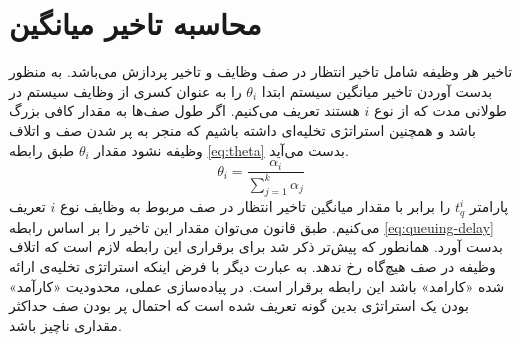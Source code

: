 \section{محاسبه تاخیر میانگین}
تاخیر هر وظیفه شامل تاخیر انتظار در صف وظایف و تاخیر پردازش می‌باشد. به منظور بدست آوردن تاخیر میانگین سیستم ابتدا $\theta_i$ را به عنوان کسری از وظایف سیستم در طولانی مدت که از نوع $i$ هستند تعریف می‌کنیم. اگر طول صف‌ها به مقدار کافی بزرگ باشد و همچنین استراتژی تخلیه‌ای داشته باشیم که منجر به پر شدن صف و اتلاف وظیفه نشود مقدار $\theta_i$ طبق رابطه \ref{eq:theta} بدست می‌آید.
\begin{equation}
\label{eq:theta}
\theta_i = \frac{\alpha_i}{\sum_{j=1}^{k} \alpha_{j}}
\end{equation}
\newpage
پارامتر \(t_q^i\) را برابر با مقدار میانگین تاخیر انتظار در صف مربوط به وظایف نوع $i$ تعریف می‌کنیم. طبق قانون  می‌توان مقدار این تاخیر را بر اساس رابطه \ref{eq:queuing-delay} بدست آورد. همانطور که پیش‌تر ذکر شد برای برقراری این رابطه لازم است که اتلاف وظیفه در صف هیچ‌گاه رخ ندهد. به عبارت دیگر با فرض اینکه استراتژی تخلیه‌ی ارائه شده «کارامد» باشد این رابطه برقرار است. در پیاده‌سازی عملی، محدودیت «کارآمد» بودن یک استراتژی بدین گونه تعریف شده است که احتمال پر بودن صف حداکثر مقداری ناچیز  باشد.

